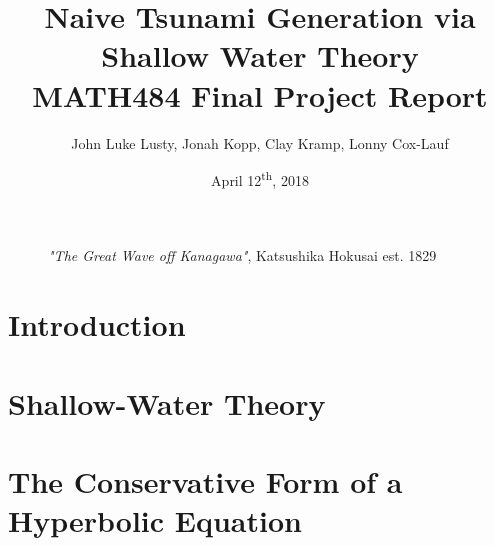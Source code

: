 \documentclass[12pt,a4]{article}
\begin{document}
\title{Naive Tsunami Generation via Shallow Water Theory\\
\large  MATH484 Final Project Report}
\author{John Luke Lusty, Jonah Kopp, Clay Kramp, Lonny Cox-Lauf}
\date{April 12\textsuperscript{th}, 2018}

\begin{titlepage}
	\maketitle
    \begin{figure}[h]
        \centering
        \caption*{\textit{"The Great Wave off Kanagawa"}, Katsushika Hokusai est. 1829}
    \end{figure}
\end{titlepage}
	
\tableofcontents
\pagebreak

\section{Introduction}


\section{Shallow-Water Theory}


\section{The Conservative Form of a Hyperbolic Equation}

\end{document}
